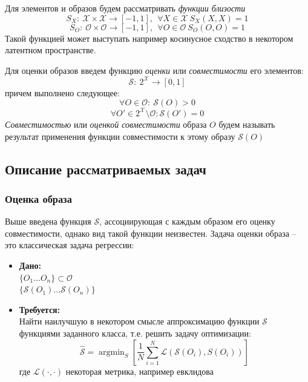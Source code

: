 \documentclass[a4paper,12pt]{article}
\DeclareMathOperator*{\argmin}{argmin}
\begin{document}
			Для элементов и образов будем рассматривать \textit{функции близости}
				$$S_X:~\mathcal{X}\times \mathcal{X}\longrightarrow [-1,1], ~~\forall X\in\mathcal{X}~S_X(X,X) = 1$$
				$$S_O:~\mathcal{O}\times \mathcal{O}\longrightarrow [-1,1], ~~\forall O\in\mathcal{O}~S_O(O,O) = 1$$
			Такой функцией может выступать например косинусное сходство в некотором латентном пространстве.
				
			Для оценки образов введем функцию \textit{оценки} или \textit{совместимости} его элементов: 
			$$\mathcal{S}:~2^\mathcal{X}\longrightarrow [0,1]$$
			 причем выполнено следующее:
			$$\forall O \in \mathcal{O}:~\mathcal{S}(O) > 0$$
			$$\forall O' \in 2^\mathcal{X} \setminus \mathcal{O}: \mathcal{S}(O') =0$$
			\textit{Совместимостью} или \textit{оценкой совместимости} образа $O$ будем называть результат применения функции совместимости к этому образу $\mathcal{S}(O)$
			
		\subsection{Описание рассматриваемых задач}
			\subsubsection{Оценка образа}
				Выше введена функция $\mathcal{S}$, ассоциирующая с каждым образом его оценку совместимости, однако вид такой функции неизвестен. Задача оценки образа -- это классическая задача регрессии:\\
				\begin{itemize}
					\item \textbf{Дано:}\\
						$\{O_1\dots O_n\}\subset \mathcal{O}$\\
						$\{\mathcal{S}(O_1)\dots\mathcal{S}(O_n)\}$
					\item \textbf{Требуется:}\\
					Найти наилучшую в некотором смысле аппроксимацию функции $\mathcal{S}$ функциями заданного класса, т.е. решить задачу оптимизации:\\
					$$\hat{\mathcal{S}}= \argmin_{S}\left[\frac{1}{N} \sum\limits_{i=1}^N\mathcal{L}(\mathcal{S}(O_i), S(O_i))\right]$$
					где $\mathcal{L}(\cdot, \cdot)$ некоторая метрика, например евклидова
				\end{itemize}
			
\end{document}
